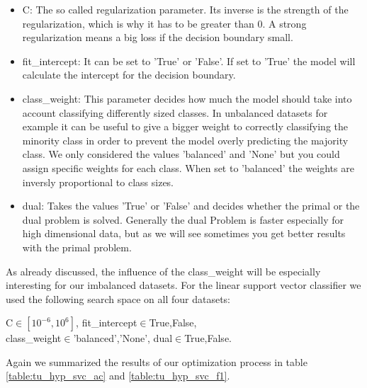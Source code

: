 \documentclass[a4paper,12pt]{article}
\begin{document}
\begin{itemize}
    \item \textsf{C}: The so called regularization parameter. Its inverse is the strength of the regularization, which is why it has to be greater than 0. A strong regularization means a big loss if the decision boundary small.
\item \textsf{fit\_intercept}: It can be set to 'True' or 'False'. If set to 'True' the model will calculate the intercept for the decision boundary.
\item\textsf{class\_weight}: This parameter decides how much the model should take into account classifying differently sized classes. In unbalanced datasets for example it can be useful to give a bigger weight to correctly classifying the minority class in order to prevent the model overly predicting the majority class. We only considered the values 'balanced' and 'None' but you could assign specific weights for each class. When set to 'balanced' the weights are inversly proportional to class sizes.
\item \textsf{dual}: Takes the values 'True' or 'False' and decides whether the primal or the dual problem is solved. Generally the dual Problem is faster especially for high dimensional data, but as we will see sometimes you get better results with the primal problem.
\end{itemize}

As already discussed, the influence of the \textsf{class\_weight} will be especially interesting for our imbalanced datasets. For the linear support vector classifier we used the following search space on all four datasets:

\begin{center}
    \parbox{0.55\textwidth}{%
    \raggedright
    \textsf{C}\(\in[10^{-6},10^{6}]\), \textsf{fit\_intercept}\(\in\){True,False},\\ \textsf{class\_weight}\(\in\){'balanced','None'}, \textsf{dual}\(\in\){True,False}.	
    }
\end{center}

Again we summarized the results of our optimization process in table \ref{table:tu_hyp_svc_ac} and \ref{table:tu_hyp_svc_f1}.
\end{document}

